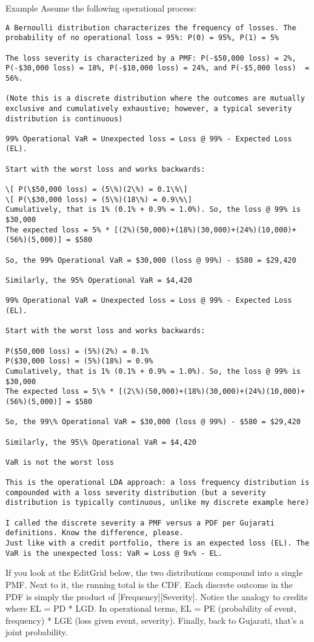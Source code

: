 \documentclass[12pt]{article}
\begin{document}
Example
Assume the following operational process:

\begin{verbatim}
A Bernoulli distribution characterizes the frequency of losses. The probability of no operational loss = 95%: P(0) = 95%, P(1) = 5%

The loss severity is characterized by a PMF: P(-$50,000 loss) = 2%, P(-$30,000 loss) = 18%, P(-$10,000 loss) = 24%, and P(-$5,000 loss)  = 56%. 

(Note this is a discrete distribution where the outcomes are mutually exclusive and cumulatively exhaustive; however, a typical severity distribution is continuous)

99% Operational VaR = Unexpected loss = Loss @ 99% - Expected Loss (EL).

Start with the worst loss and works backwards:

\[ P(\$50,000 loss) = (5\%)(2\%) = 0.1\%\]
\[ P(\$30,000 loss) = (5\%)(18\%) = 0.9\%\]
Cumulatively, that is 1% (0.1% + 0.9% = 1.0%). So, the loss @ 99% is $30,000
The expected loss = 5% * [(2%)(50,000)+(18%)(30,000)+(24%)(10,000)+(56%)(5,000)] = $580

So, the 99% Operational VaR = $30,000 (loss @ 99%) - $580 = $29,420

Similarly, the 95% Operational VaR = $4,420

99% Operational VaR = Unexpected loss = Loss @ 99% - Expected Loss (EL).

Start with the worst loss and works backwards:

P($50,000 loss) = (5%)(2%) = 0.1%
P($30,000 loss) = (5%)(18%) = 0.9%
Cumulatively, that is 1% (0.1% + 0.9% = 1.0%). So, the loss @ 99% is $30,000
The expected loss = 5\% * [(2\%)(50,000)+(18%)(30,000)+(24%)(10,000)+(56%)(5,000)] = $580

So, the 99\% Operational VaR = $30,000 (loss @ 99%) - $580 = $29,420

Similarly, the 95\% Operational VaR = $4,420

VaR is not the worst loss

This is the operational LDA approach: a loss frequency distribution is compounded with a loss severity distribution (but a severity distribution is typically continuous, unlike my discrete example here)

I called the discrete severity a PMF versus a PDF per Gujarati definitions. Know the difference, please.
Just like with a credit portfolio, there is an expected loss (EL). The VaR is the unexpected loss: VaR = Loss @ 9x% - EL.
\end{verbatim}
If you look at the EditGrid below, the two distributions compound into a single PMF. Next to it, the running total is the CDF. Each discrete outcome in the PDF is simply the product of [Frequency][Severity]. Notice the analogy to credits where EL = PD * LGD. In operational terms, EL = PE (probability of event, frequency) * LGE (loss given event, severity). Finally, back to Gujarati, that's a joint probability.
 
\end{document}
